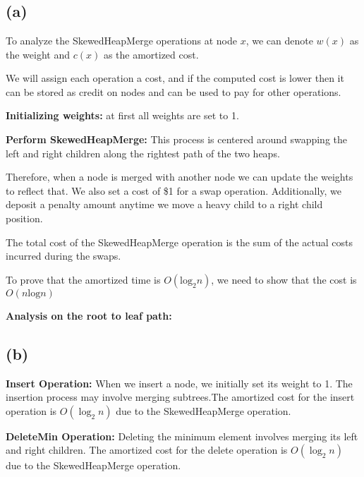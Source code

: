 \section{}
\subsection*{(a)}
To analyze the SkewedHeapMerge operations at node $x$, we can denote $w(x)$ as the weight and $c(x)$ as the amortized cost.

We will assign each operation a cost, and if the computed cost is lower then it can be stored as credit on nodes and can be used to pay for other operations.

\textbf{Initializing weights:} at first all weights are set to 1.

\textbf{Perform SkewedHeapMerge:} This process is centered around swapping the left and right children along the rightest path of the two heaps.

Therefore, when a node is merged with another node we can update the weights to reflect that. We also set a cost of \$1 for a swap operation. Additionally, we deposit a penalty amount anytime we move a heavy child to a right child position.

The total cost of the SkewedHeapMerge operation is the sum of the actual costs incurred during the swaps.

To prove that the amortized time is $O(\text{log}_2n)$, we need to show that the cost is $O(n\text{log}n)$

\textbf{Analysis on the root to leaf path:}

\subsection*{(b)}
\textbf{Insert Operation:}
When we insert a node, we initially set its weight to 1. The insertion process may involve merging subtrees.The amortized cost for the insert operation is \(O(\log_2 n)\) due to the SkewedHeapMerge operation.

\textbf{DeleteMin Operation:}
Deleting the minimum element involves merging its left and right children. The amortized cost for the delete operation is \(O(\log_2 n)\) due to the SkewedHeapMerge operation.